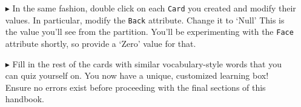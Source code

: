 \begin{itemize}
\vspace{0.5cm}

\item[$\blacktriangleright$] In the same fashion, double click on each \texttt{Card} you created and modify their values. In particular, modify the
\texttt{Back} attribute. Change it to `Null' This is the value you'll see from the partition. You'll be experimenting with the \texttt{Face} attribute shortly,
so provide a `Zero' value for that.

\vspace{0.5cm}

\item[$\blacktriangleright$] Fill in the rest of the cards with similar vocabulary-style words that you can quiz yourself on. You now have a unique, customized
learning box! Ensure no errors exist before proceeding with the final sections of this handbook.

\end{itemize}

